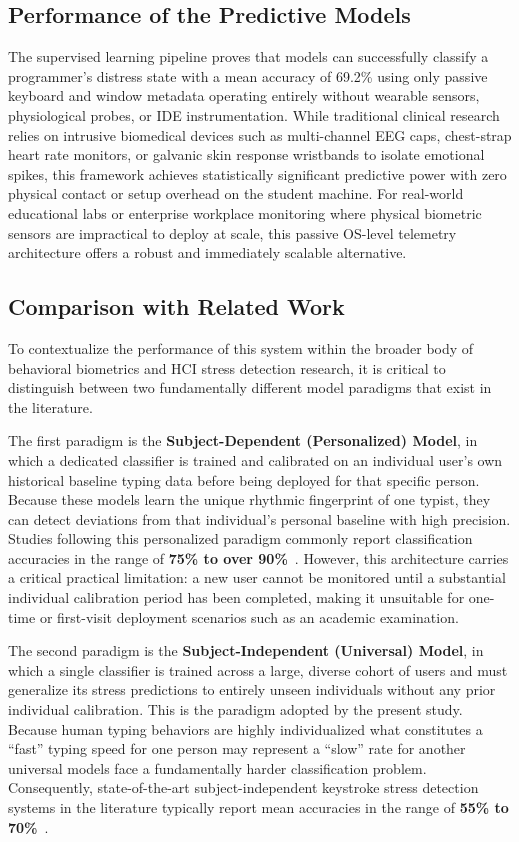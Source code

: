 \subsection{Performance of the Predictive Models}
The supervised learning pipeline proves that models can successfully classify a programmer's distress state with a mean accuracy of 69.2\% using only passive keyboard and window metadata  operating entirely without wearable sensors, physiological probes, or IDE instrumentation. While traditional clinical research relies on intrusive biomedical devices such as multi-channel EEG caps, chest-strap heart rate monitors, or galvanic skin response wristbands to isolate emotional spikes, this framework achieves statistically significant predictive power with zero physical contact or setup overhead on the student machine. For real-world educational labs or enterprise workplace monitoring where physical biometric sensors are impractical to deploy at scale, this passive OS-level telemetry architecture offers a robust and immediately scalable alternative.

\subsection{Comparison with Related Work}
To contextualize the performance of this system within the broader body of behavioral biometrics and HCI stress detection research, it is critical to distinguish between two fundamentally different model paradigms that exist in the literature.

\noindent The first paradigm is the \textbf{Subject-Dependent (Personalized) Model}, in which a dedicated classifier is trained and calibrated on an individual user's own historical baseline typing data before being deployed for that specific person. Because these models learn the unique rhythmic fingerprint of one typist, they can detect deviations from that individual's personal baseline with high precision. Studies following this personalized paradigm commonly report classification accuracies in the range of \textbf{75\% to over 90\%}~\cite{cmuKeystroke}. However, this architecture carries a critical practical limitation: a new user cannot be monitored until a substantial individual calibration period has been completed, making it unsuitable for one-time or first-visit deployment scenarios such as an academic examination.

\noindent The second paradigm is the \textbf{Subject-Independent (Universal) Model}, in which a single classifier is trained across a large, diverse cohort of users and must generalize its stress predictions to entirely unseen individuals without any prior individual calibration. This is the paradigm adopted by the present study. Because human typing behaviors are highly individualized  what constitutes a ``fast'' typing speed for one person may represent a ``slow'' rate for another  universal models face a fundamentally harder classification problem. Consequently, state-of-the-art subject-independent keystroke stress detection systems in the literature typically report mean accuracies in the range of \textbf{55\% to 70\%}~\cite{researchgateKeystroke, ijritcc2023}.

